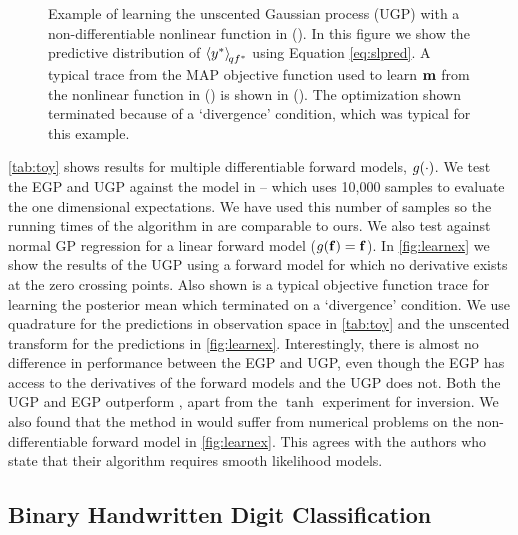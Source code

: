 \documentclass{article} %
\begin{document}
\begin{figure}[tb]
    \caption[]{Example of learning the unscented Gaussian process (UGP) with a
        non-differentiable nonlinear function in (). In this
        figure we show the predictive distribution of
        $\left\langle{\ensuremath{y}\ensuremath{^{*}}}\right\rangle_{\!{qf^{*}}}$ using Equation \eqref{eq:slpred}.
        A typical trace from the MAP objective function used to learn $\mathbf{m}$
        from the nonlinear function in () is shown in
        (). The optimization shown terminated because of a
        `divergence' condition, which was typical for this example.}

    \label{fig:learnex}
\end{figure}

\autoref{tab:toy} shows results for multiple differentiable forward models,
$g\!\left({{\cdot}}\right)$. We test the EGP and UGP against the model in \cite{Opper2009}
-- which uses 10,000 samples to evaluate the one dimensional expectations. We
have used this number of  samples so the running times of the algorithm in
\cite{Opper2009} are comparable to ours.  We also test against normal GP
regression for a linear forward model ($g\!\left({{\mathbf{f}}}\right) = \mathbf{f}$). In
\autoref{fig:learnex} we show the results of the UGP using a forward model for
which no derivative exists at the zero crossing points. Also shown is a typical
objective function trace for learning the posterior mean which terminated on a
`divergence' condition. We use quadrature for the predictions in observation
space in \autoref{tab:toy} and the unscented transform for the predictions in
\autoref{fig:learnex}.  Interestingly, there is almost no difference in
performance between the EGP and UGP, even though the EGP has access to the
derivatives of the forward models and the UGP does not. Both the UGP and EGP
outperform \cite{Opper2009}, apart from the $\tanh$ experiment for inversion.
We also found that the method in \cite{Opper2009} would suffer from numerical
problems  on the non-differentiable forward model in \autoref{fig:learnex}.
This agrees with the authors who state that their algorithm requires smooth
likelihood models.

\subsection{Binary Handwritten Digit Classification}
\end{document}
